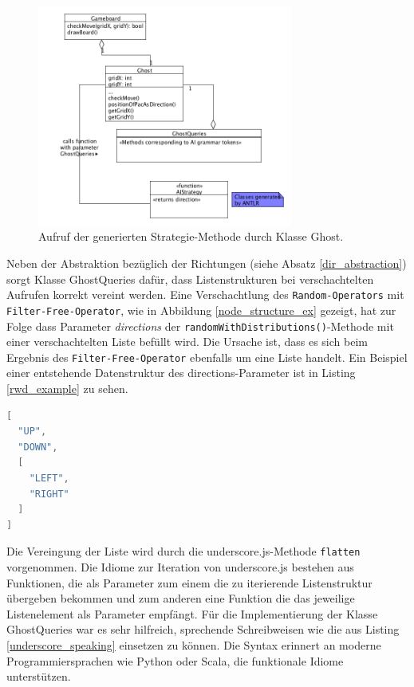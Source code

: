 \documentclass[conference]{IEEEtran}
\begin{document}
\begin{figure}[!htb]
\centering
\includegraphics[width=3.3in]{queries.png}
\caption{Aufruf der generierten Strategie-Methode durch Klasse Ghost.}
\label{ai_call}
\end{figure}

Neben der Abstraktion bezüglich der Richtungen (siehe Absatz \ref{dir_abstraction}) sorgt Klasse GhostQueries dafür, dass Listenstrukturen bei verschachtelten Aufrufen korrekt vereint werden. Eine Verschachtlung des \texttt{Random-Operators} mit \texttt{Filter-Free-Operator}, wie in
Abbildung \ref{node_structure_ex} gezeigt, hat zur Folge dass Parameter \emph{directions} der \texttt{randomWithDistributions()}-Methode mit einer verschachtelten Liste
befüllt wird. Die Ursache ist, dass es sich beim Ergebnis des \texttt{Filter-Free-Operator} ebenfalls um eine Liste handelt. Ein Beispiel einer entstehende Datenstruktur des directions-Parameter ist in Listing \ref{rwd_example} zu sehen.

\begin{lstlisting}[language=Java, captionpos=b, caption=Beispiel einer verschachtelten Datenstruktur als directions-Parameter von randomWithDistributions(), label=rwd_example]
[
  "UP",
  "DOWN",
  [
    "LEFT",
    "RIGHT"
  ]
]
\end{lstlisting}


Die Vereingung der Liste wird durch die underscore.js-Methode \texttt{flatten} vorgenommen. Die Idiome zur Iteration von underscore.js bestehen aus Funktionen,
die als Parameter zum einem die zu iterierende Listenstruktur übergeben bekommen und zum anderen eine Funktion die das jeweilige Listenelement
als Parameter empfängt. Für die Implementierung der Klasse GhostQueries war es sehr hilfreich, sprechende Schreibweisen wie die aus Listing \ref{underscore_speaking} einsetzen zu können. Die Syntax erinnert an moderne Programmiersprachen wie Python oder Scala, die funktionale Idiome unterstützen.
\end{document}
